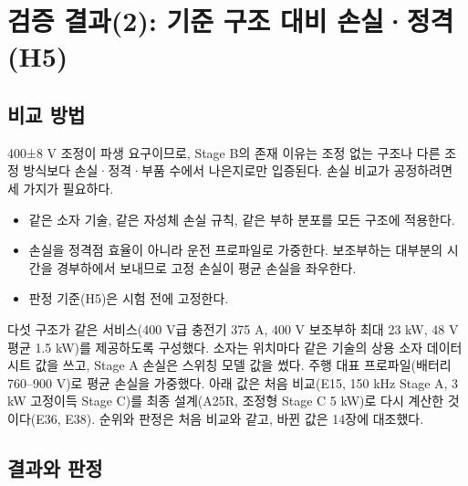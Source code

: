 \chapter{검증 결과(2): 기준 구조 대비 손실·정격(H5)}

\section{비교 방법}

400±8 V 조정이 파생 요구이므로, Stage B의 존재 이유는 조정 없는 구조나 다른 조정 방식보다 손실·정격·부품 수에서 나은지로만 입증된다. 손실 비교가 공정하려면 세 가지가 필요하다.

\begin{itemize}
\item 같은 소자 기술, 같은 자성체 손실 규칙, 같은 부하 분포를 모든 구조에 적용한다.
\item 손실을 정격점 효율이 아니라 운전 프로파일로 가중한다. 보조부하는 대부분의 시간을 경부하에서 보내므로 고정 손실이 평균 손실을 좌우한다\cite{b11}.
\item 판정 기준(H5)은 시험 전에 고정한다.
\end{itemize}

다섯 구조가 같은 서비스(400 V급 충전기 375 A, 400 V 보조부하 최대 23 kW, 48 V 평균 1.5 kW)를 제공하도록 구성했다. 소자는 위치마다 같은 기술의 상용 소자 데이터시트 값\cite{b12,b13,b14,b15}을 쓰고, Stage A 손실은 스위칭 모델 값을 썼다. 주행 대표 프로파일(배터리 760–900 V)로 평균 손실을 가중했다. 아래 값은 처음 비교(E15, 150 kHz Stage A, 3 kW 고정이득 Stage C)를 최종 설계(A25R, 조정형 Stage C 5 kW)로 다시 계산한 것이다(E36, E38). 순위와 판정은 처음 비교와 같고, 바뀐 값은 14장에 대조했다.

\section{결과와 판정}

